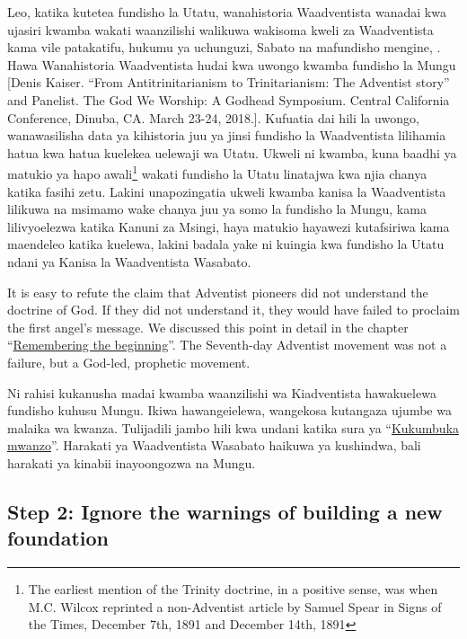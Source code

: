 Leo, katika kutetea fundisho la Utatu, wanahistoria Waadventista wanadai kwa ujasiri kwamba wakati waanzilishi walikuwa wakisoma kweli za Waadventista kama vile patakatifu, hukumu ya uchunguzi, Sabato na mafundisho mengine, . Hawa Wanahistoria Waadventista hudai kwa uwongo kwamba fundisho la Mungu [Denis Kaiser. “From Antitrinitarianism to Trinitarianism: The Adventist story” and Panelist. The God We Worship: A Godhead Symposium. Central California Conference, Dinuba, CA. March 23-24, 2018.]. Kufuatia dai hili la uwongo, wanawasilisha data ya kihistoria juu ya jinsi fundisho la Waadventista lilihamia hatua kwa hatua kuelekea uelewaji wa Utatu. Ukweli ni kwamba, kuna baadhi ya matukio ya hapo awali\footnote{The earliest mention of the Trinity doctrine, in a positive sense, was when M.C. Wilcox reprinted a non-Adventist article by Samuel Spear in Signs of the Times, December 7th, 1891 and December 14th, 1891} wakati fundisho la Utatu linatajwa kwa njia chanya katika fasihi zetu. Lakini unapozingatia ukweli kwamba kanisa la Waadventista lilikuwa na msimamo wake chanya juu ya somo la fundisho la Mungu, kama lilivyoelezwa katika Kanuni za Msingi, haya matukio hayawezi kutafsiriwa kama maendeleo katika kuelewa, lakini badala yake ni kuingia kwa fundisho la Utatu ndani ya Kanisa la Waadventista Wasabato.


It is easy to refute the claim that Adventist pioneers did not understand the doctrine of God. If they did not understand it, they would have failed to proclaim the first angel’s message. We discussed this point in detail in the chapter “\hyperref[chap:remembering-the-beginning]{Remembering the beginning}”. The Seventh-day Adventist movement was not a failure, but a God-led, prophetic movement.


Ni rahisi kukanusha madai kwamba waanzilishi wa Kiadventista hawakuelewa fundisho kuhusu Mungu. Ikiwa hawangeielewa, wangekosa kutangaza ujumbe wa malaika wa kwanza. Tulijadili jambo hili kwa undani katika sura ya “\hyperref[chap:remembering-the-beginning]{Kukumbuka mwanzo}”. Harakati ya Waadventista Wasabato haikuwa ya kushindwa, bali harakati ya kinabii inayoongozwa na Mungu.


\subsection*{Step 2: Ignore the warnings of building a new foundation}


